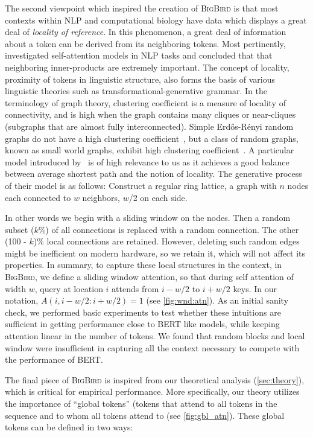 The second viewpoint which inspired the creation of \textsc{BigBird} is that  most contexts within NLP and computational biology have data which displays a great deal of \emph{locality of reference}. In this phenomenon, a great deal of information about a token can be derived from its neighboring tokens. Most pertinently, \citet{clark2019does} investigated self-attention models in NLP tasks and concluded that that neighboring inner-products are extremely important. The concept of locality, proximity of tokens in linguistic structure, also forms the basis of various linguistic theories such as transformational-generative grammar. In the terminology of graph theory, clustering coefficient is a measure of locality of connectivity, and is high when the graph contains many cliques or near-cliques (subgraphs that are almost fully interconnected). Simple Erd\H{o}s-R\'enyi random graphs do not have a high clustering coefficient~\citep{sussman2017clusteringcoeff}, but a class of random graphs, known as small world graphs, exhibit high clustering coefficient~\citep{watts1998collective}. A particular model introduced by~\citet{watts1998collective} is of high relevance to us as it achieves a good balance between average shortest path and the notion of locality. The generative process of their model is as follows: Construct a regular ring lattice, a graph with $n$ nodes each connected to $w$ neighbors, $w$/2 on each side.

In other words we begin with a sliding window on the nodes. Then a random subset ($k$\%) of all connections is replaced with a random connection. The other (100 - $k$)\% local connections are retained. However, deleting such random edges might be inefficient on modern hardware, so we retain it, which will not affect its properties. In summary, to capture these local structures in the context, in \textsc{BigBird}, we define a sliding window attention, so that during self attention of width $w$, query at location $i$ attends from $i-w/2$ to $i+w/2$ keys. In our notation, $A(i, i-w/2:i+w/2) = 1$  (see \ref{fig:wnd:atn}). 
As an initial sanity check, we performed basic experiments to test whether these intuitions are sufficient in getting performance close to BERT like models, while keeping attention linear in the number of tokens. We found that random blocks and local window were insufficient in capturing all the context necessary to compete with the performance of BERT.

The final piece of \textsc{BigBird} is inspired from our theoretical analysis  (\ref{sec:theory}), which is critical for empirical performance. More specifically, our theory utilizes the importance of ``global tokens'' (tokens that attend to all tokens in the sequence and to whom all tokens attend to (see \ref{fig:gbl_atn}). 
These global tokens can be defined in two ways:

